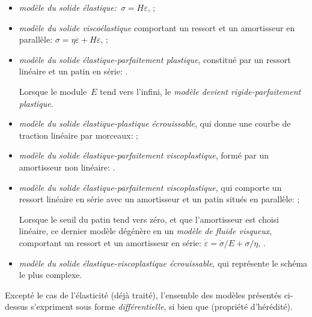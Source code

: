 \begin{itemize}
  \item \emph{modèle du solide élastique:}~$\sigma = H \varepsilon$, ;
  \item \emph{modèle du solide viscoélastique} comportant un ressort et un amortisseur en parallèle:
	$\sigma=\eta\dot{\varepsilon}+H\varepsilon$, ;
  \item \emph{modèle du solide élastique-parfaitement plastique}, constitué par un ressort linéaire et
	un patin en série: .

	Lorsque le module~$E$ tend vers l'infini, le \emph{modèle devient rigide-parfaitement plastique}.
  \item \emph{modèle du solide élastique-plastique écrouissable}, qui donne une courbe de traction
	linéaire par morceaux: ;
  \item \emph{modèle du solide élastique-parfaitement viscoplastique}, formé par un amortisseur non linéaire:
	.
\item \emph{modèle du solide élastique-parfaitement viscoplastique}, qui comporte un ressort linéaire en série
	avec un amortisseur et un patin situés en parallèle: ;

	Lorsque le seuil du patin tend vers zéro, et que l'amortisseur est choisi linéaire, ce dernier modèle
	dégénère en un \emph{modèle de fluide visqueux}, comportant un ressort et un amortisseur en série:
	$\dot{\varepsilon}=\dot{\sigma}/E+\sigma/\eta$, .
  \item \emph{modèle du solide élastique-viscoplastique écrouissable}, qui représente le schéma le plus complexe.
\end{itemize}
\medskipvm
Excepté le cas de l'élasticité (déjà traité), l'ensemble des modèles présentés ci-dessus s'expriment
sous forme \emph{différentielle}, si bien que  (propriété d'hérédité).

